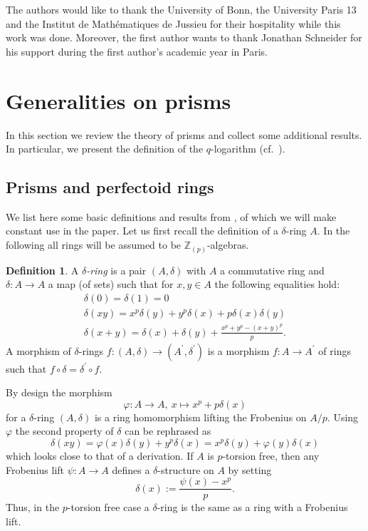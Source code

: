 \documentclass{amsart}
\theoremstyle{plain}
\theoremstyle{definition}
\newtheorem{definition}[theorem]{Definition}
\newcommand{\Z}{\mathbb{Z}}
\begin{document}
The authors would like to thank the University of Bonn, the University Paris 13 and the Institut de Math\'ematiques de Jussieu for their hospitality while this work was done.
Moreover, the first author wants to thank Jonathan Schneider for his support during the first author's academic year in Paris.


\newpage
\section{Generalities on prisms}
\label{sec:generalities-prisms}

In this section we review the theory of prisms and collect some additional results. In particular, we present the definition of the $q$-logarithm (cf.\ ).



\subsection{Prisms and perfectoid rings}
\label{sec:prisms-perf-rings}

We list here some basic definitions and results from \cite{bhatt_scholze_prisms_and_prismatic_cohomology}, of which we will make constant use in the paper. Let us first recall the definition of a $\delta$-ring $A$. In the following all rings will be assumed to be $\Z_{(p)}$-algebras.

\begin{definition}
\label{sec:misc-things-delta-definition-delta-ring}
A \textit{$\delta$-ring} is a pair $(A,\delta)$ with $A$ a commutative ring and $\delta\colon A\to A$ a map (of sets) such that for $x,y\in A$ the following equalities hold:
$$
\begin{matrix}
\delta(0)=\delta(1)=0 \\
\delta(xy)=x^p\delta(y)+y^p\delta(x)+p\delta(x)\delta(y)\\
\delta(x+y)=\delta(x)+\delta(y)+\frac{x^p+y^p-(x+y)^p}{p}.
\end{matrix}
$$
A morphism of $\delta$-rings $f\colon (A,\delta)\to (A^\prime,\delta^\prime)$ is a morphism $f\colon A\to A^\prime$ of rings such that $f\circ \delta=\delta^\prime\circ f$. 
\end{definition}

By design the morphism
$$
\varphi\colon A\to A,\ x\mapsto x^p+p\delta(x)
$$
for a $\delta$-ring $(A,\delta)$ is a ring homomorphism lifting the Frobenius on $A/p$.
Using $\varphi$ the second property of $\delta$ can be rephrased as
$$
\delta(xy)=\varphi(x)\delta(y)+y^p\delta(x)=x^p\delta(y)+\varphi(y)\delta(x)
$$
which looks close to that of a derivation.
 If $A$ is $p$-torsion free, then any Frobenius lift $\psi\colon A\to A$ defines a $\delta$-structure on $A$ by setting 
$$
\delta(x):=\frac{\psi(x)-x^p}{p}.
$$
Thus, in the $p$-torsion free case a $\delta$-ring is the same as a ring with a Frobenius lift. 
\end{document}
